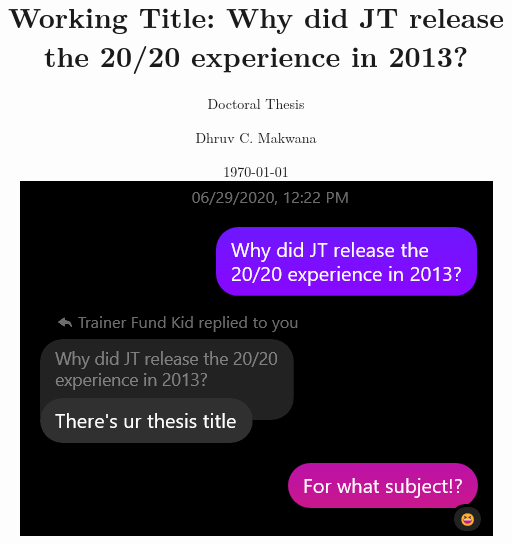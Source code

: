 
\title[Working Title: Why did JT release the 20/20 experience in 2013?]{Working Title: Why did JT release the 20/20 experience in 2013?}
\subtitle{Doctoral Thesis}
\author[D. C. Makwana]{Dhruv C. Makwana}%
\date{\today \\[\baselineskip] \includegraphics[width=.8\textwidth]{figures/working-title.png}
}


\frontmatter %


%
%
%
%
%
%
%
%

